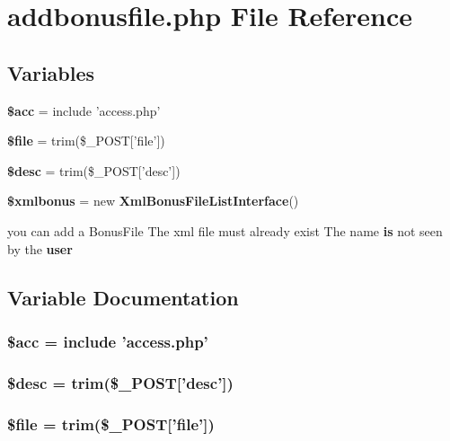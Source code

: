 \section{addbonusfile.php File Reference}
\label{addbonusfile_8php}


\subsection*{Variables}
\begin{CompactItemize}
\item 
{\bf \$acc} = include 'access.php'
\item 
{\bf \$file} = trim(\$\_\-POST['file'])
\item 
{\bf \$desc} = trim(\$\_\-POST['desc'])
\item 
{\bf \$xmlbonus} = new {\bf Xml\-Bonus\-File\-List\-Interface}()
\item 
you can add a Bonus\-File The xml file must already exist The name {\bf is} not seen by the {\bf user}
\end{CompactItemize}


\subsection{Variable Documentation}
\subsubsection{\setlength{\rightskip}{0pt plus 5cm}\$acc = include 'access.php'}\label{addbonusfile_8php_542926c588a05eb69553d79c83cf73da}


\subsubsection{\setlength{\rightskip}{0pt plus 5cm}\$desc = trim(\$\_\-POST['desc'])}\label{addbonusfile_8php_31059b9e4d0c5af34df20da32232ea9a}


\subsubsection{\setlength{\rightskip}{0pt plus 5cm}\$file = trim(\$\_\-POST['file'])}\label{addbonusfile_8php_a1bfbd27060176201b271918dff57e8f}



